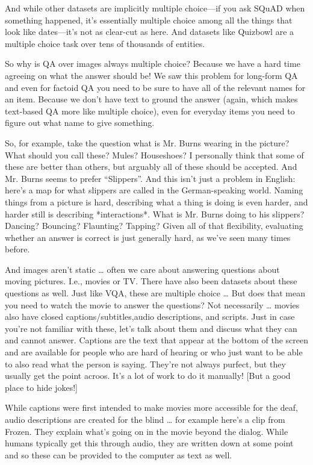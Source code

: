 And while other datasets are implicitly multiple choice—if you ask SQuAD when something happened, it’s essentially multiple choice among all the things that look like dates—it’s not as clear-cut as here.  And datasets like Quizbowl are a multiple choice task over tens of thousands of entities.  

So why is QA over images always multiple choice?  Because we have a hard time agreeing on what the answer should be!  We saw this problem for long-form QA and even for factoid QA you need to be sure to have all of the relevant names for an item.  Because we don’t have text to ground the answer (again, which makes text-based QA more like multiple choice), even for everyday items you need to figure out what name to give something. 

So, for example, take the question what is Mr. Burns wearing in the picture?  What should you call these?  Mules?  Houseshoes?  I personally think that some of these are better than others, but arguably all of these should be accepted.  And Mr. Burns seems to prefer “Slippers”.  And this isn’t just a problem in English: here’s a map for what slippers are called in the German-speaking world.  Naming things from a picture is hard, describing what a thing is doing is even harder, and harder still is describing *interactions*.  What is Mr. Burns doing to his slippers?  Dancing? Bouncing? Flaunting? Tapping?  Given all of that flexibility, evaluating whether an answer is correct is just generally hard, as we’ve seen many times before.

And images aren’t static … often we care about answering questions about moving pictures.  I.e., movies or TV.  There have also been datasets about these questions as well.  Just like VQA, these are multiple choice … But does that mean you need to watch the movie to answer the questions?  Not necessarily … movies also have closed captions/subtitles,audio descriptions, and scripts.  Just in case you’re not familiar with these, let’s talk about them and discuss what they can and cannot answer.
Captions are the text that appear at the bottom of the screen and are available for people who are hard of hearing or who just want to be able to also read what the person is saying.  They’re not always purfect, but they usually get the point acroos.  It’s a lot of work to do it manually!  [But a good place to hide jokes!]

While captions were first intended to make movies more accessible for the deaf, audio descriptions are created for the blind … for example here’s a clip from Frozen.  They explain what’s going on in the movie beyond the dialog.  While humans typically get this through audio, they are written down at some point and so these can be provided to the computer as text as well.

